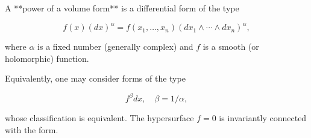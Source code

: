 A **power of a volume form** is a differential form of the type

$$f(x)(dx)^\alpha = f(x_1, \ldots, x_n)(dx_1 \wedge \cdots \wedge dx_n)^\alpha,$$

where $\alpha$ is a fixed number (generally complex) and $f$ is a smooth (or holomorphic) function.

Equivalently, one may consider forms of the type

$$f^\beta dx, \quad \beta = 1/\alpha,$$

whose classification is equivalent. The hypersurface $f = 0$ is invariantly connected with the form.
